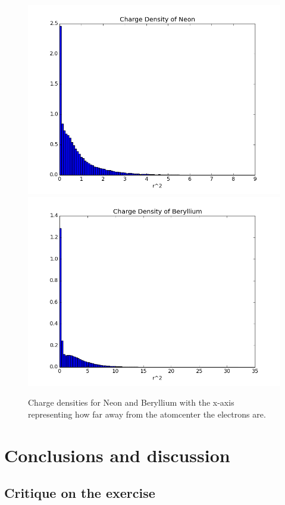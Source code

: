 \documentclass[11pt]{article}
\begin{document}
			\begin{figure}
				\centering \includegraphics[width=0.45\linewidth]{../figures/ChargeDensityNeon}
				\centering \includegraphics[width=0.45\linewidth]{../figures/ChargeDensityBeryllium}
				\protect\caption{Charge densities for Neon and Beryllium with the x-axis representing how far away from the atomcenter the electrons are. }
				\label{fig:charge_density}
			\end{figure}

\section{Conclusions and discussion}
	\subsection{Critique on the exercise}










\end{document}
